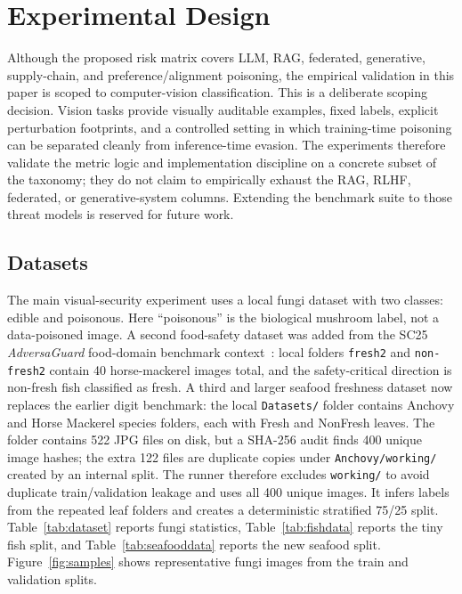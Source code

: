 ﻿\documentclass[6p,10pt,times]{ieeeaccess}
\begin{document}
\section{Experimental Design}

Although the proposed risk matrix covers LLM, RAG, federated, generative, supply-chain, and preference/alignment poisoning, the empirical validation in this paper is scoped to computer-vision classification. This is a deliberate scoping decision. Vision tasks provide visually auditable examples, fixed labels, explicit perturbation footprints, and a controlled setting in which training-time poisoning can be separated cleanly from inference-time evasion. The experiments therefore validate the metric logic and implementation discipline on a concrete subset of the taxonomy; they do not claim to empirically exhaust the RAG, RLHF, federated, or generative-system columns. Extending the benchmark suite to those threat models is reserved for future work.

\subsection{Datasets}

The main visual-security experiment uses a local fungi dataset with two classes: edible and poisonous. Here ``poisonous'' is the biological mushroom label, not a data-poisoned image. A second food-safety dataset was added from the SC25 \emph{AdversaGuard} food-domain benchmark context~\cite{adversaguard}: local folders \texttt{fresh2} and \texttt{non-fresh2} contain 40 horse-mackerel images total, and the safety-critical direction is non-fresh fish classified as fresh. A third and larger seafood freshness dataset now replaces the earlier digit benchmark: the local \texttt{Datasets/} folder contains Anchovy and Horse Mackerel species folders, each with Fresh and NonFresh leaves. The folder contains 522 JPG files on disk, but a SHA-256 audit finds 400 unique image hashes; the extra 122 files are duplicate copies under \texttt{Anchovy/working/} created by an internal split. The runner therefore excludes \texttt{working/} to avoid duplicate train/validation leakage and uses all 400 unique images. It infers labels from the repeated leaf folders and creates a deterministic stratified 75/25 split. Table~\ref{tab:dataset} reports fungi statistics, Table~\ref{tab:fishdata} reports the tiny fish split, and Table~\ref{tab:seafooddata} reports the new seafood split. Figure~\ref{fig:samples} shows representative fungi images from the train and validation splits.
\end{document}
